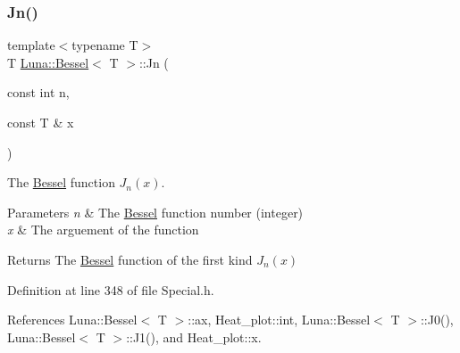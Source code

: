\subsubsection{\texorpdfstring{Jn()}{Jn()}}
{\footnotesize\ttfamily template$<$typename T$>$ \\
T \hyperlink{structLuna_1_1Bessel}{Luna\+::\+Bessel}$<$ T $>$\+::Jn (\begin{DoxyParamCaption}\item[{const int}]{n,  }\item[{const T \&}]{x }\end{DoxyParamCaption})\hspace{0.3cm}{\ttfamily [inline]}}



The \hyperlink{structLuna_1_1Bessel}{Bessel} function $ J_n(x) $. 


\begin{DoxyParams}{Parameters}
{\em n} & The \hyperlink{structLuna_1_1Bessel}{Bessel} function number (integer) \\
\hline
{\em x} & The arguement of the function \\
\hline
\end{DoxyParams}
\begin{DoxyReturn}{Returns}
The \hyperlink{structLuna_1_1Bessel}{Bessel} function of the first kind $ J_n(x) $ 
\end{DoxyReturn}


Definition at line 348 of file Special.\+h.



References Luna\+::\+Bessel$<$ T $>$\+::ax, Heat\+\_\+plot\+::int, Luna\+::\+Bessel$<$ T $>$\+::\+J0(), Luna\+::\+Bessel$<$ T $>$\+::\+J1(), and Heat\+\_\+plot\+::x.


